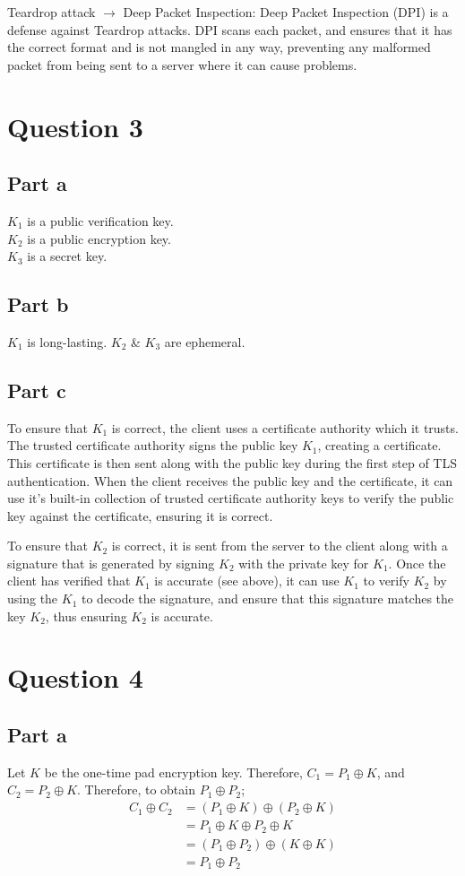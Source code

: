 \documentclass[12pt,a4paper]{article}
\begin{document}
Teardrop attack \(\rightarrow\) Deep Packet Inspection: Deep Packet Inspection (DPI) is a defense against Teardrop attacks. DPI scans each packet, and ensures that it has the correct format and is not mangled in any way, preventing any malformed packet from being sent to a server where it can cause problems.

\section{Question 3}
\subsection{Part a}
\(K_1\) is a public verification key.\\
\(K_2\) is a public encryption key.\\
\(K_3\) is a secret key.

\subsection{Part b}
\(K_1\) is long-lasting.
\(K_2\) \& \(K_3\) are ephemeral.

\subsection{Part c}
To ensure that \(K_1\) is correct, the client uses a certificate authority which it trusts. The trusted certificate authority signs the public key \(K_1\), creating a certificate. This certificate is then sent along with the public key during the first step of TLS authentication. When the client receives the public key and the certificate, it can use it's built-in collection of trusted certificate authority keys to verify the public key against the certificate, ensuring it is correct.

To ensure that \(K_2\) is correct, it is sent from the server to the client along with a signature that is generated by signing \(K_2\) with the private key for \(K_1\). Once the client has verified that \(K_1\) is accurate (see above), it can use \(K_1\) to verify \(K_2\) by using the \(K_1\) to decode the signature, and ensure that this signature matches the key \(K_2\), thus ensuring \(K_2\) is accurate.

\section{Question 4}
\subsection{Part a}
Let \(K\) be the one-time pad encryption key. Therefore, \(C_1 = P_1 \oplus K\), and \(C_2 = P_2 \oplus K\).
Therefore, to obtain \(P_1 \oplus P_2\);
\begin{align*}
  C_1 \oplus C_2 &= (P_1 \oplus K) \oplus (P_2 \oplus K)\\
  &= P_1 \oplus K \oplus P_2 \oplus K\\
  &= (P_1 \oplus P_2) \oplus (K \oplus K)\\
  &= P_1 \oplus P_2
\end{align*}
\end{document}
